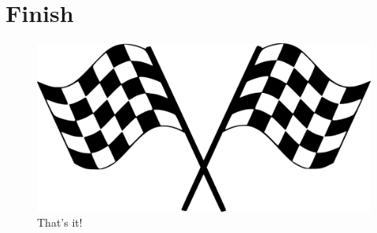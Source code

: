 \chapter{Finish}
\label{appendix:finish}

\vfill
\begin{figure}[h]
	\includegraphics[width=\textwidth]{img/finish}
	\caption{That's it!}
\end{figure}
\vfill
